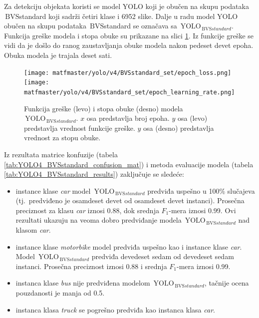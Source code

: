 \documentclass[12pt,oneside]{memoir}
\newcommand{\yolo}{\ensuremath{\,\textrm{YOLO}}}
\newcommand{\bvs}{\ensuremath{\,\textrm{BVS}}}
\begin{document}
Za detekciju objekata koristi se model YOLO koji je obučen na skupu podataka \bvs{standard} koji sadrži četiri klase i 6952 slike. Dalje u radu model YOLO obučen na skupu podataka \bvs{standard} se označava sa $\yolo_{\bvs{standard}}$. Funkcija greške modela i stopa obuke su prikazane na slici \ref{fig:YOLO4_BVSstandard_loss}. Iz funkcije greške se vidi da je došlo do ranog zaustavljanja obuke modela nakon pedeset devet epoha. Obuka modela je trajala deset sati.

\begin{figure}[!ht]
\centering
    \texttt{[image: matfmaster/yolo/v4/BVSstandard\_set/epoch\_loss.png]}
    \texttt{[image: matfmaster/yolo/v4/BVSstandard\_set/epoch\_learning\_rate.png]}
\caption{Funkcija greške (levo) i stopa obuke (desno) modela $\yolo_{\bvs{standard}}$. $x$ osa predstavlja broj epoha. $y$ osa (levo) predstavlja vrednost funkcije greške. $y$ osa (desno) predstavlja vrednost za stopu obuke.}
\label{fig:YOLO4_BVSstandard_loss}
\end{figure}

Iz rezultata matrice konfuzije (tabela \ref{tab:YOLO4_BVSstandard_confusion_mat}) i metoda evaluacije modela (tabela \ref{tab:YOLO4_BVSstandard_results}) zaključuje se sledeće:
\begin{itemize}
    \item instance klase \textit{car} model $\yolo_{\bvs{standard}}$ predviđa uspešno u 100\% slučajeva (tj.~predviđeno je osamdeset devet od osamdeset devet instanci). Prosečna preciznost za klasu \textit{car} iznosi 0.88, dok srednja $F_1$-mera iznosi 0.99. Ovi rezultati ukazuju na veoma dobro predviđanje modela  $\yolo_{\bvs{standard}}$ nad klasom \textit{car}.
    \item instance klase \textit{motorbike} model predviđa uspešno kao i instance klase \textit{car}. Model $\yolo_{\bvs{standard}}$ predviđa devedeset sedam od devedeset sedam instanci. Prosečna preciznost iznosi 0.88 i srednja $F_1$-mera iznosi 0.99.
    \item instanca klase \textit{bus} nije predviđena modelom  $\yolo_{\bvs{standard}}$, tačnije ocena pouzdanosti je manja od 0.5.
    \item instanca klasa \textit{truck} se pogrešno predviđa kao instanca klasa \textit{car}. 
\end{itemize}
\end{document}
